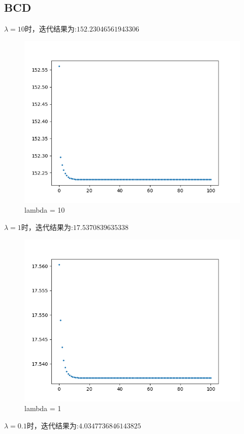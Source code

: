 \documentclass{xjtureport}
\begin{document}
\subsection{BCD}
$\lambda = 10$时，迭代结果为:$152.23046561943306$
\begin{figure}[H]
    \centering
    \includegraphics[scale = 0.6]{figures/BCD_lam=10.png}
    \caption{lambda = 10}
    \end{figure}
$\lambda = 1$时，迭代结果为:$17.5370839635338$
\begin{figure}[H]
    \centering
    \includegraphics[scale = 0.6]{figures/BCD_lam=1.png}
    \caption{lambda = 1}
    \end{figure}
$\lambda = 0.1$时，迭代结果为:$4.0347736846143825$
\end{document}
